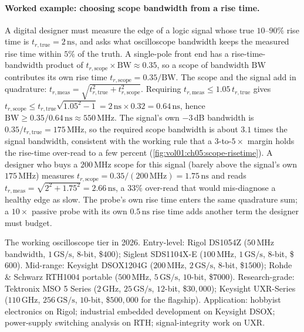 

\paragraph{Worked example: choosing scope bandwidth from a rise
time.} A digital designer must measure the edge of a logic signal
whose true $10$--$90\%$ rise time is $t_{r,\text{true}} = 2 \,\si{
\nano\second}$, and asks what oscilloscope bandwidth keeps the
measured rise time within $5\%$ of the truth. A single-pole
front end has a rise-time-bandwidth product of $t_{r,\text{scope}}
\times \text{BW} \approx 0.35$, so a scope of bandwidth
$\text{BW}$ contributes its own rise time
$t_{r,\text{scope}} = 0.35/\text{BW}$. The scope and the signal
add in quadrature: $t_{r,\text{meas}} = \sqrt{t_{r,\text{true}}^{2}
+ t_{r,\text{scope}}^{2}}$. Requiring $t_{r,\text{meas}} \leq
1.05 \, t_{r,\text{true}}$ gives $t_{r,\text{scope}} \leq
t_{r,\text{true}} \sqrt{1.05^{2} - 1} = 2 \,\si{\nano\second}
\times 0.32 = 0.64 \,\si{\nano\second}$, hence
$\text{BW} \geq 0.35/0.64 \,\si{\nano\second} \approx 550 \,\si{
\mega\hertz}$. The signal's own $-3\,$dB bandwidth is
$0.35/t_{r,\text{true}} = 175 \,\si{\mega\hertz}$, so the required
scope bandwidth is about $3.1$ times the signal bandwidth,
consistent with the working rule that a $3$-to-$5\times$ margin
holds the rise-time over-read to a few percent
(\cref{fig:vol01:ch05:scope-risetime}). A designer who buys a
$200 \,\si{\mega\hertz}$ scope for this signal (barely above the
signal's own $175 \,\si{\mega\hertz}$) measures
$t_{r,\text{scope}} = 0.35/(200 \,\si{\mega\hertz}) = 1.75 \,\si{
\nano\second}$ and reads
$t_{r,\text{meas}} = \sqrt{2^{2} + 1.75^{2}} = 2.66 \,\si{\nano
\second}$, a $33\%$ over-read that would mis-diagnose a healthy
edge as slow. The probe's own rise time enters the same quadrature
sum; a $10\times$ passive probe with its own $0.5 \,\si{\nano
\second}$ rise time adds another term the designer must budget.

The working oscilloscope tier in 2026. Entry-level: Rigol DS1054Z
($50\,\si{\mega\hertz}$ bandwidth, $1\,\text{GS/s}$, $8$-bit,
\$$400$); Siglent SDS1104X-E ($100\,\si{\mega\hertz}$,
$1\,\text{GS/s}$, $8$-bit, \$$600$). Mid-range: Keysight DSOX1204G
($200\,\si{\mega\hertz}$, $2\,\text{GS/s}$, $8$-bit, \$$1500$);
Rohde \& Schwarz RTH1004 portable ($500\,\si{\mega\hertz}$,
$5\,\text{GS/s}$, $10$-bit, \$$7000$). Research-grade: Tektronix
MSO 5 Series ($2\,\si{\giga\hertz}$, $25\,\text{GS/s}$,
$12$-bit, \$$30{,}000$); Keysight UXR-Series ($110\,\si{\giga
\hertz}$, $256\,\text{GS/s}$, $10$-bit, \$$500{,}000$ for the
flagship). Application: hobbyist electronics on Rigol; industrial
embedded development on Keysight DSOX; power-supply switching
analysis on RTH; signal-integrity work on UXR.

